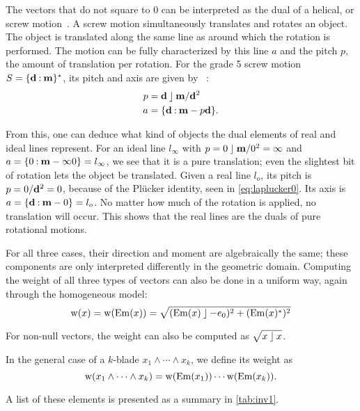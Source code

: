 The vectors that do not square to $0$ can be interpreted as the dual of a helical, or screw motion~\cite[Section 3.1.2]{Pottmann}.  A screw motion simultaneously translates and rotates an object.  The object is translated along the same line as around which the rotation is performed.  The motion can be fully characterized by this line $a$ and the pitch $p$, the amount of translation per rotation.  For the grade 5 screw motion $S = \{\mathbf{d} \mathbin{:} \mathbf{m}\}^\ast$, its pitch and axis are given by ~\cite[Theorem 3.1.9]{Pottmann}:
\begin{align}
  \label{eq:screwparams}
  p &= \mathbf{d} \mathbin{\rfloor} \mathbf{m} / \mathbf{d}^2 \nonumber \\
  a &= \{\mathbf{d} \mathbin{:} \mathbf{m} - p \mathbf{d}\} .
\end{align}

From this, one can deduce what kind of objects the dual elements of real and ideal lines represent.  For an ideal line $l_\infty$ with $p = 0 \mathbin{\rfloor} \mathbf{m} / 0^2 = \infty$ and $a = \{0 \mathbin{:} \mathbf{m} - \infty 0\} = l_\infty$, we see that it is a pure translation; even the slightest bit of rotation lets the object be translated.  Given a real line $l_o$, its pitch is $p = 0 / \mathbf{d}^2 = 0$, because of the Pl\"ucker identity, seen in \autoref{eq:laplucker0}.  Its axis is $a = \{\mathbf{d} \mathbin{:} \mathbf{m} - 0\} = l_o$.  No matter how much of the rotation is applied, no translation will occur.  This shows that the real lines are the duals of pure rotational motions.

For all three cases, their direction and moment are algebraically the same; these components are only interpreted differently in the geometric domain.  Computing the weight of all three types of vectors can also be done in a uniform way, again through the homogeneous model:
\begin{equation*}
  \operatorname{w}(x) = 
      \operatorname{w}(\operatorname{Em}(x)) = \sqrt{(\operatorname{Em}(x) \mathbin{\rfloor} -e_0)^2 + (\operatorname{Em}(x)^\ast)^2} 
\end{equation*}

For non-null vectors, the weight can also be computed as $\sqrt{x \mathbin{\rfloor} x}$.

In the general case of a $k$-blade $x_1 \wedge \cdots \wedge x_k$, we define its weight as 
\begin{equation*}
  \operatorname{w}(x_1 \wedge \cdots \wedge x_k) = \operatorname{w}(\operatorname{Em}(x_1)) \cdots \operatorname{w}(\operatorname{Em}(x_k)) .
\end{equation*}

A list of these elements is presented as a summary in \autoref{tab:inv1}. 


